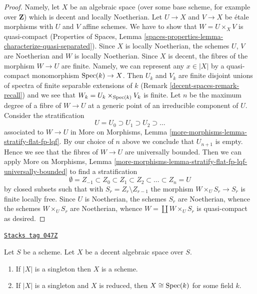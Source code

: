 \begin{proof}
Namely, let $X$ be an algebraic space (over some base scheme, for
example over $\mathbf{Z}$) which is decent and locally Noetherian.
Let $U \to X$ and $V \to X$ be \'etale morphisms with $U$ and $V$
affine schemes. We have to show that $W = U \times_X V$ is quasi-compact
(Properties of Spaces, Lemma
\ref{spaces-properties-lemma-characterize-quasi-separated}).
Since $X$ is locally Noetherian, the schemes $U$, $V$ are Noetherian
and $W$ is locally Noetherian. Since $X$ is decent, the fibres
of the morphism $W \to U$ are finite. Namely, we can represent
any $x \in |X|$ by a quasi-compact monomorphism $\operatorname{Spec}(k) \to X$.
Then $U_k$ and $V_k$ are finite disjoint unions of spectra of
finite separable extensions of $k$ (Remark \ref{decent-spaces-remark-recall})
and we see that $W_k = U_k \times_{\operatorname{Spec}(k)} V_k$ is finite.
Let $n$ be the maximum degree of a fibre of $W \to U$ at a generic
point of an irreducible component of $U$. Consider the stratification
$$
U = U_0 \supset U_1 \supset U_2 \supset \ldots
$$
associated to $W \to U$ in
More on Morphisms, Lemma \ref{more-morphisms-lemma-stratify-flat-fp-lqf}.
By our choice of $n$ above we conclude that $U_{n + 1}$ is empty.
Hence we see that the fibres of $W \to U$ are universally bounded.
Then we can apply More on Morphisms, Lemma
\ref{more-morphisms-lemma-stratify-flat-fp-lqf-universally-bounded}
to find a stratification
$$
\emptyset = Z_{-1} \subset Z_0 \subset Z_1 \subset Z_2 \subset
\ldots \subset Z_n = U
$$
by closed subsets such that with $S_r = Z_r \setminus Z_{r - 1}$
the morphism $W \times_U S_r \to S_r$ is finite locally free.
Since $U$ is Noetherian, the schemes $S_r$ are Noetherian,
whence the schemes $W \times_U S_r$ are Noetherian, whence
$W = \coprod W \times_U S_r$ is quasi-compact as desired.
\end{proof}

\begin{lemma}
\label{decent-spaces-lemma-when-field}
\href{https://stacks.math.columbia.edu/tag/047Z}{\texttt{Stacks tag 047Z}}

Let $S$ be a scheme. Let $X$ be a decent algebraic space over $S$.
\begin{enumerate}
\item If $|X|$ is a singleton then $X$ is a scheme.
\item If $|X|$ is a singleton and $X$ is reduced, then
$X \cong \operatorname{Spec}(k)$ for some field $k$.
\end{enumerate}
\end{lemma}

